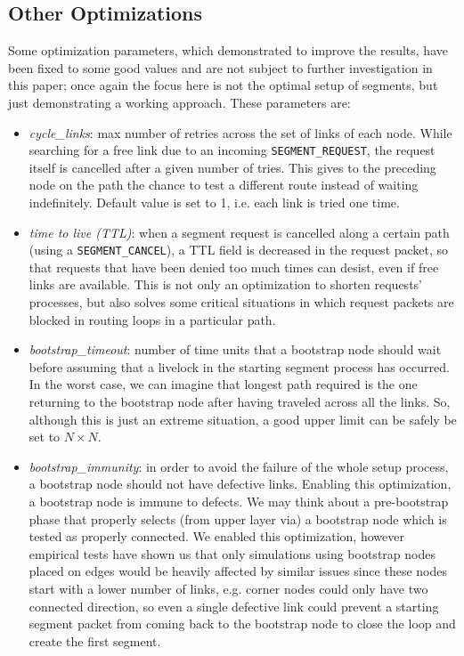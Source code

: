\subsection{Other Optimizations}
Some optimization parameters, which demonstrated to improve the \disr{}
results, have been fixed to some good values and are not subject to
further investigation in this paper; once again the focus here is not the
optimal setup of segments, but just demonstrating a working approach. 
These parameters are:
\begin{itemize}
\item \emph{cycle\_links}: max number of retries across the set of links of
each node. While searching for a free link due to an incoming \texttt{SEGMENT\_REQUEST},
the request itself is cancelled after a given number of tries. This
gives to the preceding node on the path the
chance to test a different route instead of waiting indefinitely.
Default value is set to 1, i.e. each link is tried one time.
\item \emph{time to live (TTL)}: when a segment request is cancelled
along a certain path (using a \texttt{SEGMENT\_CANCEL}), a TTL field is
decreased in the request packet, so that requests that have been
denied too much times can desist, even if free links are
available. This is not only an optimization to shorten
requests' processes, but also solves some critical situations in which
request packets are blocked in routing loops in a particular path.
\item \emph{bootstrap\_timeout}: number of time units that a bootstrap node
should wait before assuming that a livelock in the starting segment
process has occurred. In the worst case, we can imagine that longest
path required is the one returning to the bootstrap node after having
traveled across all the links. So, although this is just an extreme
situation, a good upper limit can be safely be set to $N \times N$.
\item \emph{bootstrap\_immunity}: in order to avoid the failure of the whole \disr{}
setup process, a bootstrap node should not have defective links.
Enabling this optimization, a bootstrap node is immune to defects.
We may think about a pre-bootstrap phase that properly selects (from upper
layer via) a bootstrap node which is tested as properly connected. We
enabled this optimization, however empirical tests have shown us that only
simulations using bootstrap nodes placed on edges would be heavily
affected by similar issues since these nodes start with a lower number of links,
e.g. corner nodes could only have two connected direction, so even a single
defective link could prevent a starting segment packet from coming back to the
bootstrap node to close the loop and create the first segment.
\end{itemize}
